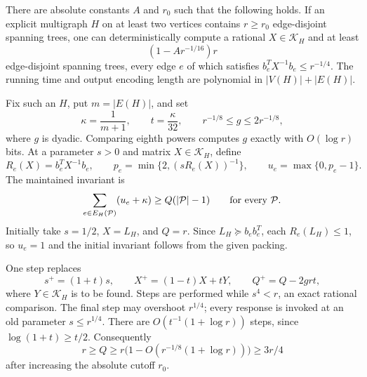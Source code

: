 \begin{proposition}
\label{prop:ta-extraction}
There are absolute constants $A$ and $r_0$ such that the following holds.
If an explicit multigraph $H$ on at least two vertices contains $r\ge r_0$
edge-disjoint spanning trees, one can deterministically compute a rational
$X\in\mathcal K_H$ and at least
\[
                 (1-Ar^{-1/16})r
\]
edge-disjoint spanning trees, every edge $e$ of which satisfies
$b_e^TX^{-1}b_e\le r^{-1/4}$. The running time and output encoding length
are polynomial in $|V(H)|+|E(H)|$.
\end{proposition}

Fix such an $H$, put $m=|E(H)|$, and set
\begin{equation}
 \kappa=\frac1{m+1},\qquad t=\frac\kappa{32},\qquad
 r^{-1/8}\le g\le2r^{-1/8},
 \label{eq:ta-parameters}
\end{equation}
where $g$ is dyadic. Comparing eighth powers computes $g$ exactly with
$O(\log r)$ bits. At a parameter $s>0$ and matrix $X\in\mathcal K_H$, define
\begin{equation}
 R_e(X)=b_e^TX^{-1}b_e,\qquad
 p_e=\min\{2,(sR_e(X))^{-1}\},\qquad
 u_e=\max\{0,p_e-1\}.
 \label{eq:ta-ramp}
\end{equation}
The maintained invariant is
\begin{equation}
 \sum_{e\in E_H(\mathcal P)}(u_e+\kappa)
       \ge Q(|\mathcal P|-1)\qquad\hbox{for every }\mathcal P.
 \label{eq:ta-invariant}
\end{equation}
Initially take $s=1/2$, $X=L_H$, and $Q=r$. Since
$L_H\succeq b_eb_e^T$, each $R_e(L_H)\le1$, so $u_e=1$ and the initial
invariant follows from the given packing.

One step replaces
\begin{equation}
 s^+=(1+t)s,\qquad X^+=(1-t)X+tY,\qquad Q^+=Q-2grt,
 \label{eq:ta-step}
\end{equation}
where $Y\in\mathcal K_H$ is to be found. Steps are performed while
$s^4<r$, an exact rational comparison. The final step may overshoot
$r^{1/4}$; every response is invoked at an old parameter
$s\le r^{1/4}$. There are
$O(t^{-1}(1+\log r))$ steps, since $\log(1+t)\ge t/2$. Consequently
\begin{equation}
 r\ge Q\ge r\bigl(1-O(r^{-1/8}(1+\log r))\bigr)\ge3r/4
 \label{eq:ta-target-bound}
\end{equation}
after increasing the absolute cutoff $r_0$.

